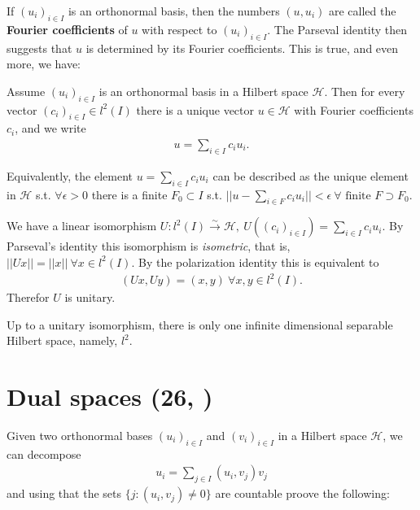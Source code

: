 If \((u_i)_{i\in I }\) is an orthonormal basis, then the numbers \((u,u_i)\) are called the \textbf{Fourier coefficients} of \(u\) with 
respect to \((u_i)_{i\in I}\). The Parseval identity then suggests that \(u\) is determined by its Fourier coefficients. This is true, 
and even more, we have:
\begin{proposition}
    Assume \((u_i)_{i\in I}\) is an orthonormal basis in a Hilbert space \(\mathcal{H}\). Then for every vector \((c_i)_{i\in I}\in l^2(I)\)
    there is a unique vector \(u\in \mathcal{H}\) with Fourier coefficients \(c_i\), and we write
    \begin{align*}
        u = \sum\limits_{i\in I} c_i u_i.
    \end{align*}
\end{proposition}
\begin{remark}
    Equivalently, the element \(u=\sum_{i\in I}c_i u_i\) can be described as the unique element in \(\mathcal{H}\) s.t. \(\forall \epsilon>0\)
    there is a finite \(F_0\subset I\) s.t. \(||u - \sum_{i\in F}c_i u_i || < \epsilon \ \forall \text{ finite } F\supset F_0\).
\end{remark}
\begin{corollary}
    We have a linear isomorphism \(U:l^2(I)\xrightarrow[ ]{\sim}\mathcal{H}, \ U\left((c_i)_{i\in I}\right) = \sum_{i\in I}c_i u_i\).
    By Parseval's identity this isomorphism is \emph{isometric}, that is, \(||Ux|| = ||x|| \ \forall x\in l^2(I)\). By the polarization identity
    this is equivalent to 
    \begin{align*}
        (Ux,Uy) = (x,y) \ \forall x,y\in l^2(I).
    \end{align*}
    Therefor \(U\) is unitary.
\end{corollary}
\begin{corollary}
    Up to a unitary isomorphism, there is only one infinite dimensional separable Hilbert space, namely, \(l^2\).
\end{corollary}

\section{Dual spaces \tiny{(26, \cite{schilling2017measures})}}
\ifdetailed 
Given two orthonormal bases \((u_i)_{i\in I}\) and \((v_i)_{i\in I}\) in a Hilbert space \(\mathcal{H}\), we can decompose
\begin{align*}
    u_i = \sum\limits_{j\in I} (u_i,v_j)v_j
\end{align*}
and using that the sets \(\{j:(u_i,v_j)\neq 0\}\) are countable proove the following:

